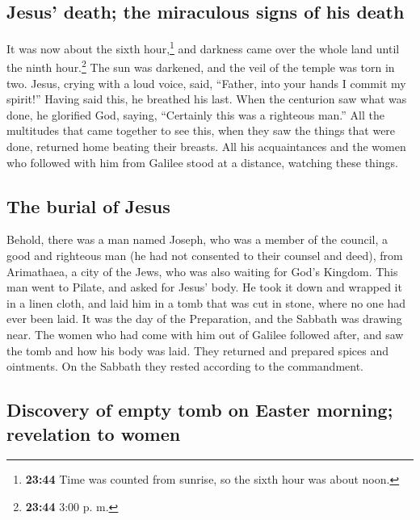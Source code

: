 \hypertarget{jesus-death-the-miraculous-signs-of-his-death}{%
\subsection{Jesus' death; the miraculous signs of his
death}\label{jesus-death-the-miraculous-signs-of-his-death}}

 It was now about the sixth hour,\footnote{\textbf{23:44}
  Time was counted from sunrise, so the sixth hour was about noon.} and
darkness came over the whole land until the ninth hour.\footnote{\textbf{23:44}
  3:00 p. m.}  The sun was darkened, and the veil of the
temple was torn in two.  Jesus, crying with a loud voice,
said, ``Father, into your hands I commit my spirit!'' Having said this,
he breathed his last.  When the centurion saw what was
done, he glorified God, saying, ``Certainly this was a righteous man.''
 All the multitudes that came together to see this, when
they saw the things that were done, returned home beating their breasts.
 All his acquaintances and the women who followed with
him from Galilee stood at a distance, watching these things.

\hypertarget{the-burial-of-jesus}{%
\subsection{The burial of Jesus}\label{the-burial-of-jesus}}

 Behold, there was a man named Joseph, who was a member
of the council, a good and righteous man  (he had not
consented to their counsel and deed), from Arimathaea, a city of the
Jews, who was also waiting for God's Kingdom.  This man
went to Pilate, and asked for Jesus' body.  He took it
down and wrapped it in a linen cloth, and laid him in a tomb that was
cut in stone, where no one had ever been laid.  It was
the day of the Preparation, and the Sabbath was drawing near.
 The women who had come with him out of Galilee followed
after, and saw the tomb and how his body was laid.  They
returned and prepared spices and ointments. On the Sabbath they rested
according to the commandment.

\hypertarget{discovery-of-empty-tomb-on-easter-morning-revelation-to-women}{%
\subsection{Discovery of empty tomb on Easter morning; revelation to
women}\label{discovery-of-empty-tomb-on-easter-morning-revelation-to-women}}

